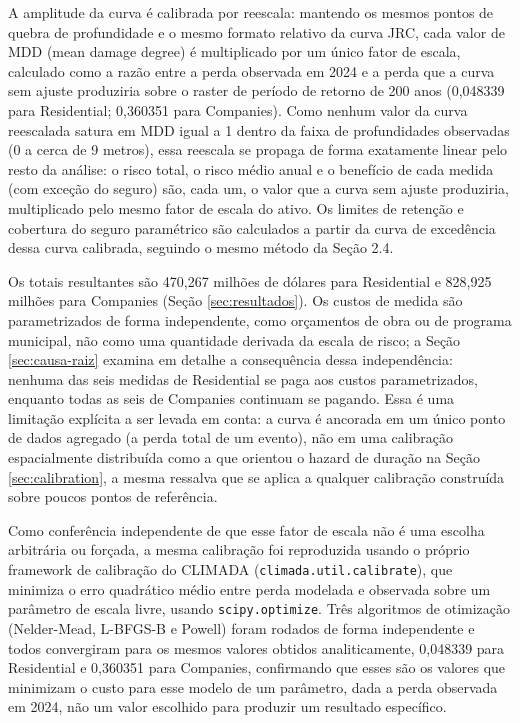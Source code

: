 \documentclass[11pt]{article}
\begin{document}
A amplitude da curva é calibrada por reescala: mantendo os mesmos pontos de quebra de
profundidade e o mesmo formato relativo da curva JRC, cada valor de MDD (mean damage
degree) é multiplicado por um único fator de escala, calculado como a razão entre a perda
observada em 2024 e a perda que a curva sem ajuste produziria sobre o raster de período de
retorno de 200 anos (0,048339 para Residential; 0,360351 para Companies). Como nenhum
valor da curva reescalada satura em MDD igual a 1 dentro da faixa de profundidades
observadas (0 a cerca de 9 metros), essa reescala se propaga de forma exatamente linear
pelo resto da análise: o risco total, o risco médio anual e o benefício de cada medida (com
exceção do seguro) são, cada um, o valor que a curva sem ajuste produziria, multiplicado
pelo mesmo fator de escala do ativo. Os limites de retenção e cobertura do seguro
paramétrico são calculados a partir da curva de excedência dessa curva calibrada, seguindo
o mesmo método da Seção 2.4.

Os totais resultantes são 470,267 milhões de dólares para Residential e 828,925 milhões
para Companies (Seção \ref{sec:resultados}). Os custos de medida são parametrizados de
forma independente, como orçamentos de obra ou de programa municipal, não como uma
quantidade derivada da escala de risco; a Seção \ref{sec:causa-raiz} examina em detalhe a
consequência dessa independência: nenhuma das seis medidas de Residential se paga aos
custos parametrizados, enquanto todas as seis de Companies continuam se pagando. Essa é
uma limitação explícita a ser levada em conta: a curva é ancorada em um único ponto de
dados agregado (a perda total de um evento), não em uma calibração espacialmente
distribuída como a que orientou o hazard de duração na Seção \ref{sec:calibration}, a mesma ressalva que se
aplica a qualquer calibração construída sobre poucos pontos de referência.

Como conferência independente de que esse fator de escala não é uma escolha arbitrária ou
forçada, a mesma calibração foi reproduzida usando o próprio framework de calibração do
CLIMADA (\texttt{climada.util.calibrate}), que minimiza o erro quadrático médio entre
perda modelada e observada sobre um parâmetro de escala livre, usando
\texttt{scipy.optimize}. Três algoritmos de otimização (Nelder-Mead, L-BFGS-B e Powell)
foram rodados de forma independente e todos convergiram para os mesmos valores obtidos
analiticamente, 0,048339 para Residential e 0,360351 para Companies, confirmando que esses
são os valores que minimizam o custo para esse modelo de um parâmetro, dada a perda
observada em 2024, não um valor escolhido para produzir um resultado específico.
\end{document}
